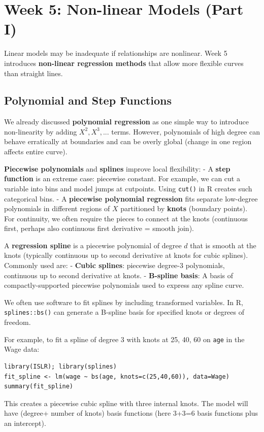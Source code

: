 \documentclass[11pt]{article}
\begin{document}
\section{Week 5: Non-linear Models (Part I)}
Linear models may be inadequate if relationships are nonlinear. Week 5 introduces \textbf{non-linear regression methods} that allow more flexible curves than straight lines.

\subsection{Polynomial and Step Functions}
We already discussed \textbf{polynomial regression} as one simple way to introduce non-linearity by adding $X^2, X^3, ...$ terms. However, polynomials of high degree can behave erratically at boundaries and can be overly global (change in one region affects entire curve).

\textbf{Piecewise polynomials} and \textbf{splines} improve local flexibility:
- A \textbf{step function} is an extreme case: piecewise constant. For example, we can cut a variable into bins and model jumps at cutpoints. Using \texttt{cut()} in R creates such categorical bins.
- A \textbf{piecewise polynomial regression} fits separate low-degree polynomials in different regions of $X$ partitioned by \textbf{knots} (boundary points). For continuity, we often require the pieces to connect at the knots (continuous first, perhaps also continuous first derivative = smooth join).

A \textbf{regression spline} is a piecewise polynomial of degree $d$ that is smooth at the knots (typically continuous up to second derivative at knots for cubic splines). Commonly used are:
- \textbf{Cubic splines}: piecewise degree-3 polynomials, continuous up to second derivative at knots.
- \textbf{B-spline basis}: A basis of compactly-supported piecewise polynomials used to express any spline curve.

We often use software to fit splines by including transformed variables. In R, \texttt{splines::bs()} can generate a B-spline basis for specified knots or degrees of freedom.

For example, to fit a spline of degree 3 with knots at 25, 40, 60 on \texttt{age} in the Wage data:
\begin{verbatim}
library(ISLR); library(splines)
fit_spline <- lm(wage ~ bs(age, knots=c(25,40,60)), data=Wage)
summary(fit_spline)
\end{verbatim}
This creates a piecewise cubic spline with three internal knots. The model will have (degree+ number of knots) basis functions (here 3+3=6 basis functions plus an intercept).
\end{document}
